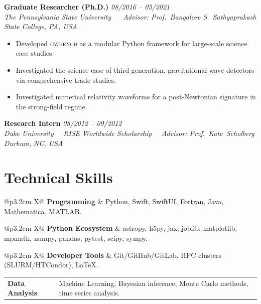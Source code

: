 \documentclass[10pt, a4paper]{article}
\makeatletter
\newcommand{\cventry}[4]{%
  \textbf{#1}                      \hfill {\color{muted}\small\textit{#4}} \\[2pt]
  {\color{muted}\small\textit{#2}} \hfill {\color{muted}\small\textit{#3}}
}
\newcommand{\cvskill}[2]{%
  \noindent
    \begin{tabularx}{\linewidth}{@{}p{3.2cm} X@{}}
    \textbf{\small #1} & {\small #2}
  \end{tabularx}\raggedright%
}
\newcommand{\tpc}{\textperiodcentered}
\makeatother
\begin{document}
\vspace{6pt}
\cventry%
  {Graduate Researcher (Ph.D.)}%
  {The Pennsylvania State University ~\tpc~ Advisor: Prof.\ Bangalore S.\ Sathyaprakash}%
  {State College, PA, USA}%
  {08/2016 -- 05/2021}
\begin{itemize}
  \item Developed \textsc{gwbench} as a modular Python framework for large-scale science case studies.
  \item Investigated the science case of third-generation, gravitational-wave detectors via comprehensive trade studies.
  \item Investigated numerical relativity waveforms for a post-Newtonian signature in the strong-field regime.
\end{itemize}

\vspace{6pt}
\cventry%
  {Research Intern}%
  {Duke University~\tpc~ RISE Worldwide Scholarship~\tpc~ Advisor: Prof.\ Kate\ Scholberg}%
  {Durham, NC, USA}%
  {08/2012 -- 09/2012}

\section{Technical Skills}
\cvskill{Programming}{Python, Swift, SwiftUI, Fortran, Java, Mathematica, MATLAB.}
\cvskill{Python Ecosystem}{astropy, h5py, jax, joblib, matplotlib, mpmath, numpy, pandas, pytest, scipy, sympy.}
\cvskill{Developer Tools}{Git/GitHub/GitLab, HPC clusters (SLURM/HTCondor), \LaTeX{}.}
\cvskill{Data Analysis}{Machine Learning, Bayesian inference, Monte Carlo methods, time series analysis.}
\end{document}
